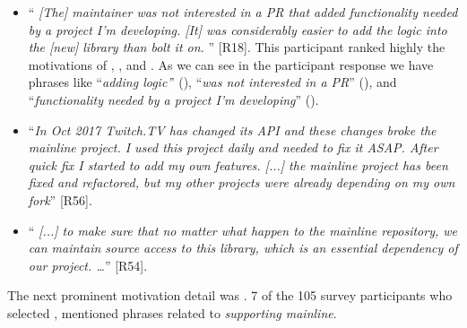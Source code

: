 \begin{itemize}[leftmargin=*]

\item ``\emph{%
[The] maintainer %
was not interested in a PR that added functionality needed by a project I'm developing. [It] was considerably easier to add the logic into the [new] library than bolt it on.%
}'' [R18]. This participant ranked highly the motivations of , , and . As we can see in the participant response we have phrases like ``\textit{adding logic'}' (), ``\textit{was not interested in a PR}'' (), and ``\textit{functionality needed by a project I'm developing}'' ().

\item ``\emph{In Oct 2017 Twitch.TV has changed its API and these changes broke the mainline project. I used this project daily and needed to fix it ASAP. After quick fix I started to add my own features. [...] the mainline project has been fixed and refactored, but my other projects were already depending on my own fork}'' [R56].

\item ``\emph{%
[...] to make sure that no matter what happen to the mainline repository, we can maintain source access to this library, which is an essential dependency of our project. \ldots}'' [R54].

\end{itemize}

\nd The next prominent  motivation detail was .
7 of the 105 survey participants who selected , mentioned phrases related to \emph{supporting mainline}.

